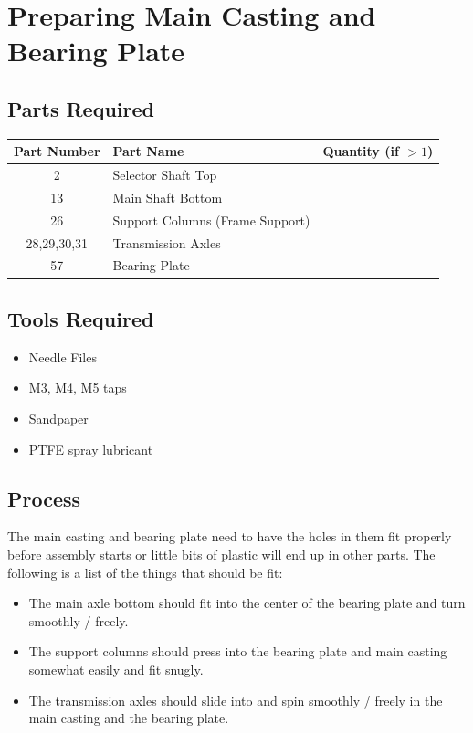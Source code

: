 \documentclass[openany]{book}
\begin{document}
\chapter{Preparing Main Casting and Bearing Plate}
\section{Parts Required}

\begin{table}[!ht]
	\centering
	\begin{tabular}{clc}
		Part Number & Part Name & Quantity (if $>1$) \\ \hline
		2 & Selector Shaft Top & \\
		13 & Main Shaft Bottom & \\
		26 & Support Columns (Frame Support) & \\
		28,29,30,31 & Transmission Axles & \\
		57 & Bearing Plate & 
	\end{tabular}
\end{table}

\section{Tools Required}

\begin{itemize}
	\item Needle Files
	\item M3, M4, M5 taps
	\item Sandpaper
	\item PTFE spray lubricant
\end{itemize}

\section{Process}

The main casting and bearing plate need to have the holes in them fit properly before assembly starts or little bits of plastic will end up in other parts. The following is a list of the things that should be fit:
\begin{itemize}
\item The main axle bottom should fit into the center of the bearing plate and turn smoothly / freely.
\item The support columns should press into the bearing plate and main casting somewhat easily and fit snugly.
\item The transmission axles should slide into and spin smoothly / freely in the main casting and the bearing plate.
\end{itemize}
\end{document}
